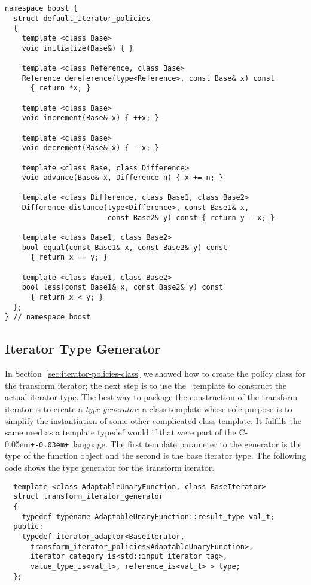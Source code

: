 \documentclass{netobjectdays}
\newcommand{\Cpp}{C\kern-0.05em\texttt{+\kern-0.03em+}}
\newcommand{\iteratoradaptor}{\code{iterator\_\-adaptor}}
\begin{document}
{\footnotesize
\begin{verbatim}
namespace boost {
  struct default_iterator_policies
  {
    template <class Base>
    void initialize(Base&) { }

    template <class Reference, class Base>
    Reference dereference(type<Reference>, const Base& x) const
      { return *x; }

    template <class Base>
    void increment(Base& x) { ++x; }

    template <class Base>
    void decrement(Base& x) { --x; }

    template <class Base, class Difference>
    void advance(Base& x, Difference n) { x += n; }

    template <class Difference, class Base1, class Base2>
    Difference distance(type<Difference>, const Base1& x,
                        const Base2& y) const { return y - x; }

    template <class Base1, class Base2>
    bool equal(const Base1& x, const Base2& y) const
      { return x == y; }

    template <class Base1, class Base2>
    bool less(const Base1& x, const Base2& y) const
      { return x < y; }
  };
} // namespace boost
\end{verbatim}
}


\subsection{Iterator Type Generator}
\label{sec:iter-type-generator}

In Section~\ref{sec:iterator-policies-class} we showed how to create
the policy class for the transform iterator; the next step is to use
the \iteratoradaptor\ template to construct the actual iterator
type. The best way to package the construction of the transform
iterator is to create a \emph{type generator}: a class
template whose sole purpose is to simplify the instantiation of some
other complicated class template. It fulfills the same need as a
template typedef would if that were part of the \Cpp\ language.  The
first template parameter to the generator is the type of the function
object and the second is the base iterator type.  The following code
shows the type generator for the transform iterator.

{\footnotesize
\begin{verbatim}
  template <class AdaptableUnaryFunction, class BaseIterator>
  struct transform_iterator_generator
  {
    typedef typename AdaptableUnaryFunction::result_type val_t;
  public:
    typedef iterator_adaptor<BaseIterator, 
      transform_iterator_policies<AdaptableUnaryFunction>,
      iterator_category_is<std::input_iterator_tag>, 
      value_type_is<val_t>, reference_is<val_t> > type;
  };
\end{verbatim}
}
\end{document}
